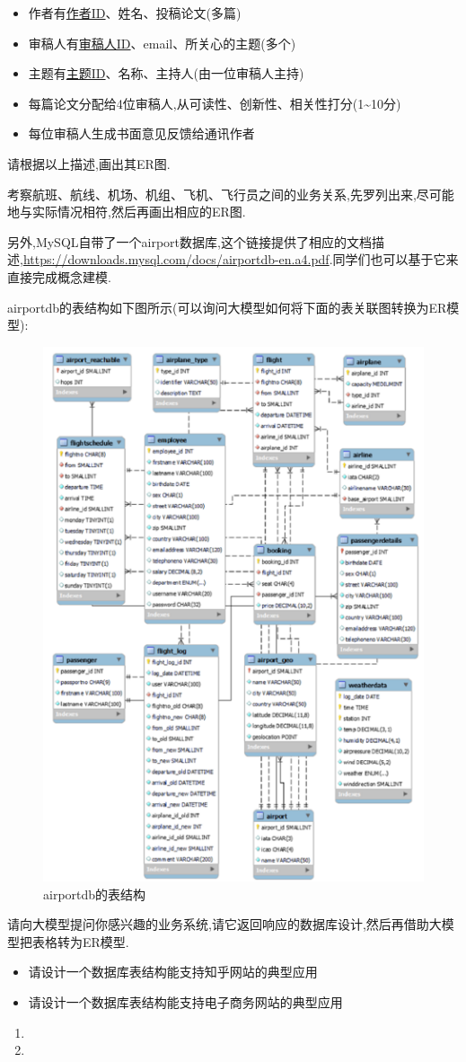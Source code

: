 \begin{problemset}
\begin{itemize}
    \item 作者有{\underline{作者ID}}、姓名、投稿论文(多篇)
    \item 审稿人有{\underline{审稿人ID}}、email、所关心的主题(多个)
    \item 主题有{\underline{主题ID}}、名称、主持人(由一位审稿人主持)
    \item 每篇论文分配给4位审稿人,从可读性、创新性、相关性打分(1\~{}10分)
    \item 每位审稿人生成书面意见反馈给通讯作者
  \end{itemize}
  请根据以上描述,画出其ER图.
  \item 考察航班、航线、机场、机组、飞机、飞行员之间的业务关系,先罗列出来,尽可能地与实际情况相符,然后再画出相应的ER图.
  
  另外,MySQL自带了一个airport数据库,这个链接提供了相应的文档描述,\url{https://downloads.mysql.com/docs/airportdb-en.a4.pdf}.同学们也可以基于它来直接完成概念建模.
  
  airportdb的表结构如下图所示(可以询问大模型如何将下面的表关联图转换为ER模型):
  \begin{figure}[H]
      \centering
      \includegraphics[width=.5\textwidth]{figure/第2章-7.pdf}
      \caption{airportdb的表结构}
  \end{figure}
  \item 请向大模型提问你感兴趣的业务系统,请它返回响应的数据库设计,然后再借助大模型把表格转为ER模型.
  \begin{itemize}
    \item 请设计一个数据库表结构能支持知乎网站的典型应用
    \item 请设计一个数据库表结构能支持电子商务网站的典型应用
  \end{itemize}
\end{problemset}

\begin{solution}
\begin{enumerate}
    \item 
    \item 
\end{enumerate}
\end{solution}

